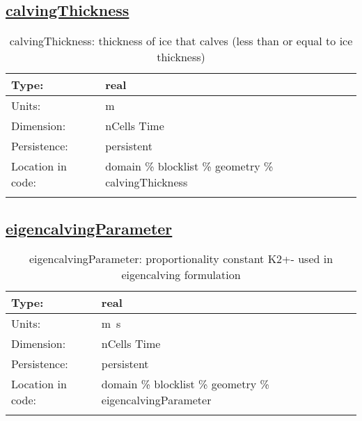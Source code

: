 \subsection[calvingThickness]{\hyperref[sec:var_tab_geometry]{calvingThickness}}
\label{subsec:var_sec_geometry_calvingThickness}
\begin{center}
\begin{longtable}{| p{2.0in} | p{4.0in} |}
        \hline 
        Type: & real \\
        \hline 
        Units: & \si{m} \\
        \hline 
        Dimension: & nCells Time \\
        \hline 
        Persistence: & persistent \\
        \hline 
         Location in code: & domain \% blocklist \% geometry \% calvingThickness \\
         \hline 
    \caption{calvingThickness: thickness of ice that calves (less than or equal to ice thickness)}
\end{longtable}
\end{center}
\subsection[eigencalvingParameter]{\hyperref[sec:var_tab_geometry]{eigencalvingParameter}}
\label{subsec:var_sec_geometry_eigencalvingParameter}
\begin{center}
\begin{longtable}{| p{2.0in} | p{4.0in} |}
        \hline 
        Type: & real \\
        \hline 
        Units: & \si{m.s} \\
        \hline 
        Dimension: & nCells Time \\
        \hline 
        Persistence: & persistent \\
        \hline 
         Location in code: & domain \% blocklist \% geometry \% eigencalvingParameter \\
         \hline 
    \caption{eigencalvingParameter: proportionality constant K2+- used in eigencalving formulation}
\end{longtable}
\end{center}
